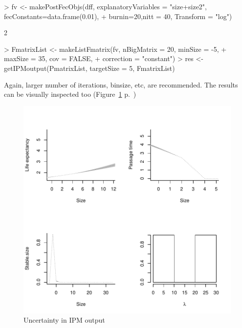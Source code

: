 \documentclass{article}
\begin{document}
\begin{Schunk}
\begin{Sinput}
> fv <- makePostFecObjs(dff, explanatoryVariables = "size+size2", fecConstants=data.frame(0.01), 
+                       burnin=20,nitt = 40, Transform = "log")
\end{Sinput}
\begin{Soutput}
[1] 2
\end{Soutput}
\begin{Sinput}
> FmatrixList <- makeListFmatrix(fv, nBigMatrix = 20, minSize = -5, 
+                                maxSize = 35, cov = FALSE,
+                                correction = "constant")
> res <- getIPMoutput(PmatrixList, targetSize = 5, FmatrixList)
\end{Sinput}
\end{Schunk}

Again, larger number of iterations, binsize, etc, are recommended. The results can be visually inspected too (Figure~\ref{fig:seven} p.~\pageref{fig:seven})
\begin{figure}
\begin{center}
\includegraphics{IPMpack_Vignette-fig7}

\end{center}
\caption{Uncertainty in IPM output}
\label{fig:seven}
\end{figure}
\end{document}
